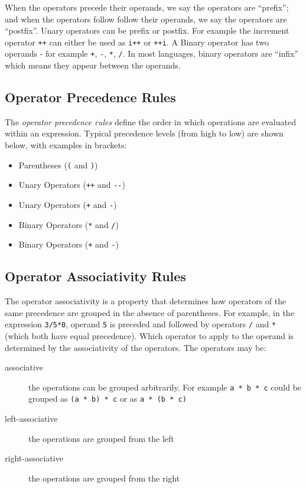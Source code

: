 When the operators precede their operands, we say the operators are ``prefix''; and when the operators follow follow their operands, we say the operators are ``postfix''. Unary operators can be prefix or postfix. For example the increment operator \verb|++| can either be used as \verb|i++| or \verb|++i|. A Binary operator has two operands - for example \verb|+|, \verb|-|, \verb|*|, \verb|/|. In most languages, binary operators are ``infix'' which means they appear between the operands.

\subsection{Operator Precedence Rules}
The \textit{operator precedence rules} define the order in which operations are evaluated within an expression. Typical precedence levels (from high to low) are shown below, with examples in brackets:
\begin{itemize}
    \item Parentheses (\verb|(| and \verb|)|)
    \item Unary Operators (\verb|++| and \verb|--|)
    \item Unary Operators (\verb|+| and \verb|-|)
    \item Binary Operators (\verb|*| and \verb|/|)
    \item Binary Operators (\verb|+| and \verb|-|)
\end{itemize}

\subsection{Operator Associativity Rules}
The operator associativity is a property that determines how operators of the same precedence are grouped in the absence of parentheses. For example, in the expression \verb|3/5*0|, operand \verb|5| is preceded and followed by operators \verb|/| and \verb|*| (which both have equal precedence). Which operator to apply to the operand is determined by the associativity of the operators. The operators may be:
\begin{description}
    \item[associative] the operations can be grouped arbitrarily. For example \verb|a * b * c| could be grouped as \verb|(a * b) * c| or as \verb|a * (b * c)|
    \item[left-associative] the operations are grouped from the left
    \item[right-associative] the operations are grouped from the right 
\end{description}

